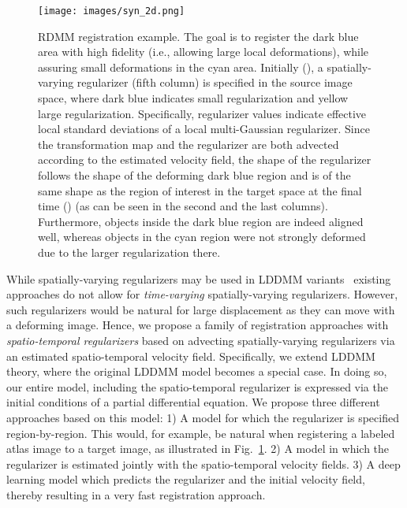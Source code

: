 \documentclass{article}
\numberwithin{equation}{section}
\newcommand{\ie}{{i.e.}}
\begin{document}
\begin{figure}[!ht]
\texttt{[image: images/syn\_2d.png]}
\caption{RDMM registration example. The goal is to register the dark blue area with high fidelity (\ie, allowing large local deformations), while assuring small deformations in the cyan area.  Initially (), a spatially-varying regularizer (fifth column) is specified in the source image space, where dark blue indicates small regularization and yellow large regularization. Specifically, regularizer values indicate effective local standard deviations of a local multi-Gaussian regularizer. Since the transformation map and the regularizer are both advected according to the estimated velocity field, the shape of the regularizer follows the shape of the deforming dark blue region and is of the same shape as the region of interest in the target space at the final time () (as can be seen in the second and the last columns). Furthermore, objects inside the dark blue region are indeed aligned well, whereas objects in the cyan region were not strongly deformed due to the larger regularization there.}
\label{fig:syn_2d}
\end{figure}






While spatially-varying regularizers may be used in LDDMM variants~\cite{schmah2013left} existing approaches do not allow for \emph{time-varying} spatially-varying regularizers. However, such regularizers would be natural for large displacement as they can move with a deforming image. Hence, we propose a family of registration approaches with \emph{spatio-temporal regularizers} based on advecting spatially-varying regularizers via an estimated spatio-temporal velocity field. Specifically, we extend LDDMM theory, where the original LDDMM model becomes a special case. In doing so, our entire model, including the spatio-temporal regularizer is expressed via the initial conditions of a partial differential equation. We propose three different approaches based on this model: 1) A model for which the regularizer is specified region-by-region. This would, for example, be natural when registering a labeled atlas image to a target image, as illustrated in Fig.~\ref{fig:syn_2d}.  2) A model in which the regularizer is estimated jointly with the spatio-temporal velocity fields. 3) A deep learning model which predicts the regularizer and the initial velocity field, thereby resulting in a very fast registration approach. 
\end{document}
